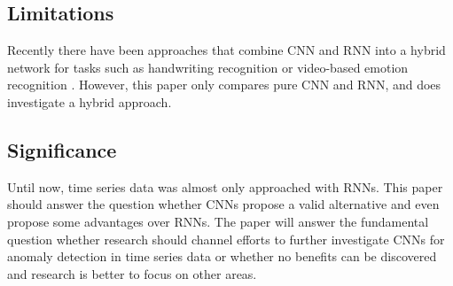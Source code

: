 \subsection{Limitations}

Recently there have been approaches that combine CNN and RNN into a hybrid network for tasks such as handwriting recognition or video-based emotion recognition \parencite{Dutta2018} \parencite{Fan2016}. However, this paper only compares pure CNN and RNN, and does investigate a hybrid approach.


\subsection{Significance}

Until now, time series data was almost only approached with RNNs. This paper should answer the question whether CNNs propose a valid alternative and even propose some advantages over RNNs. The paper will answer the fundamental question whether research should channel efforts to further investigate CNNs for anomaly detection in time series data or whether no benefits can be discovered and research is better to focus on other areas. 

